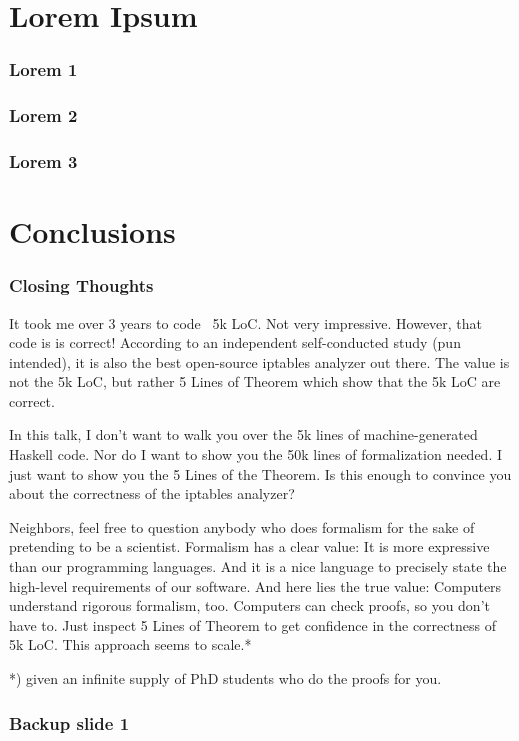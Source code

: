\documentclass[aspectratio=169]{beamer}
\begin{document}
\section{Lorem Ipsum}

\begin{frame}
	\frametitle{Lorem 1}
	\blindtext
\end{frame}

\begin{frame}
	\frametitle{Lorem 2}
	\blindtext
\end{frame}

\begin{frame}
	\frametitle{Lorem 3}
	\blindtext
\end{frame}



\section{Conclusions}

\begin{frame}
	\frametitle{Closing Thoughts}
	It took me over 3 years to code ~5k LoC. Not very impressive. However, that code is is correct! According to an independent self-conducted study (pun intended), it is also the best open-source iptables analyzer out there. The value is not the 5k LoC, but rather 5 Lines of Theorem which show that the 5k LoC are correct.

In this talk, I don’t want to walk you over the 5k lines of machine-generated Haskell code. Nor do I want to show you the 50k lines of formalization needed. I just want to show you the 5 Lines of the Theorem. Is this enough to convince you about the correctness of the iptables analyzer?

Neighbors, feel free to question anybody who does formalism for the sake of pretending to be a scientist. Formalism has a clear value: It is more expressive than our programming languages. And it is a nice language to precisely state the high-level requirements of our software. And here lies the true value: Computers understand rigorous formalism, too. Computers can check proofs, so you don’t have to. Just inspect 5 Lines of Theorem to get confidence in the correctness of 5k LoC. This approach seems to scale.*

*) given an infinite supply of PhD students who do the proofs for you.
\end{frame}



\appendix
\backupbegin
  \begin{frame}
    \frametitle{Backup slide 1}
    \blindtext
  \end{frame}
\backupend
\end{document}
